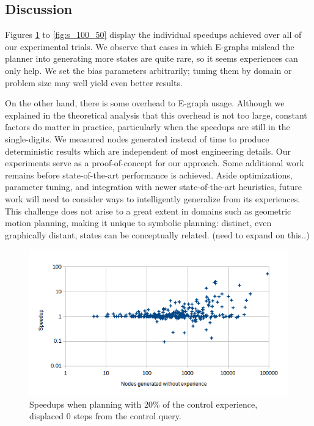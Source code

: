 \documentclass[letterpaper]{article}
\begin{document}
\subsection{Discussion}

Figures \ref{fig:s_20_0} to \ref{fig:s_100_50} display the individual speedups achieved over all of our experimental trials. We observe that cases in which E-graphs mislead the planner into generating more states are quite rare, so it seems experiences can only help. We set the bias parameters arbitrarily; tuning them by domain or problem size may well yield even better results.

On the other hand, there is some overhead to E-graph usage.
Although we explained in the theoretical analysis that this overhead is not too large, constant factors do matter in practice, particularly when the speedups are still in the single-digits.
We measured nodes generated instead of time to produce deterministic results which are independent of most engineering details.
Our experiments serve as a proof-of-concept for our approach. Some additional work remains before state-of-the-art performance is achieved.
Aside optimizations, parameter tuning, and integration with newer state-of-the-art heuristics, future work will need to consider ways to intelligently generalize from its experiences. This challenge does not arise to a great extent in domains such as geometric motion planning, making it unique to symbolic planning: distinct, even graphically distant, states can be conceptually related. (need to expand on this..)

\begin{figure}
	\begin{center}
	\includegraphics[scale=0.5]{Speedup_20_0.png}
	\end{center}
	\caption{Speedups when planning with 20\% of the control experience, displaced 0 steps from the control query.}
	 \label{fig:s_20_0}
\end{figure}
\end{document}
